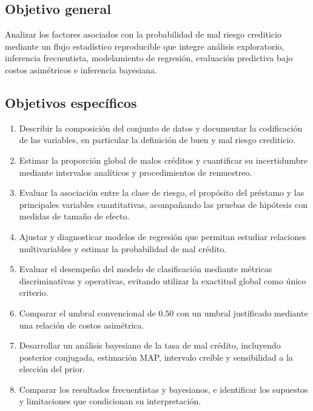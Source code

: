 \subsection{Objetivo general}

Analizar los factores asociados con la probabilidad de mal riesgo
crediticio mediante un flujo estadístico reproducible que integre
análisis exploratorio, inferencia frecuentista, modelamiento de
regresión, evaluación predictiva bajo costos asimétricos e inferencia
bayesiana.

\subsection{Objetivos específicos}

\begin{enumerate}
    \item Describir la composición del conjunto de datos y documentar la
    codificación de las variables, en particular la definición de buen y
    mal riesgo crediticio.

    \item Estimar la proporción global de malos créditos y cuantificar su
    incertidumbre mediante intervalos analíticos y procedimientos de
    remuestreo.

    \item Evaluar la asociación entre la clase de riesgo, el propósito
    del préstamo y las principales variables cuantitativas, acompañando
    las pruebas de hipótesis con medidas de tamaño de efecto.

    \item Ajustar y diagnosticar modelos de regresión que permitan
    estudiar relaciones multivariables y estimar la probabilidad de mal
    crédito.

    \item Evaluar el desempeño del modelo de clasificación mediante
    métricas discriminativas y operativas, evitando utilizar la
    exactitud global como único criterio.

    \item Comparar el umbral convencional de \(0.50\) con un umbral
    justificado mediante una relación de costos asimétrica.

    \item Desarrollar un análisis bayesiano de la tasa de mal crédito,
    incluyendo posterior conjugada, estimación MAP, intervalo creíble y
    sensibilidad a la elección del prior.

    \item Comparar los resultados frecuentistas y bayesianos, e
    identificar los supuestos y limitaciones que condicionan su
    interpretación.
\end{enumerate}


